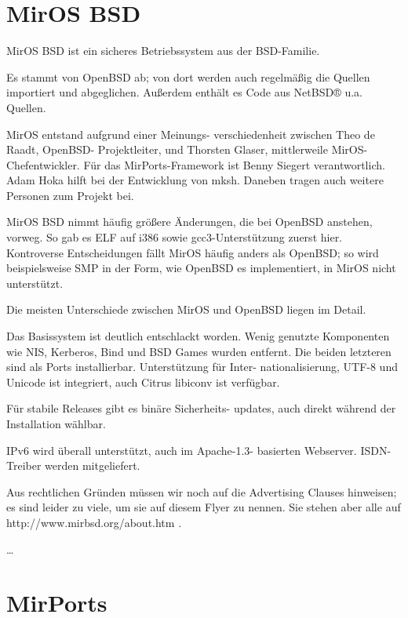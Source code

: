 \documentclass[
a4paper,%
notumble%
]{leaflet}
\begin{document}
\newpage

\section{MirOS BSD}

{\Large MirOS BSD ist ein sicheres Betriebssystem aus der BSD-Familie.\par}

Es stammt von OpenBSD ab; von dort werden auch regelmäßig die Quellen importiert und abgeglichen. Außerdem enthält es Code aus NetBSD® u.a. Quellen.

MirOS entstand aufgrund einer Meinungs- verschiedenheit zwischen Theo de Raadt, OpenBSD- Projektleiter, und Thorsten Glaser, mittlerweile MirOS- Chefentwickler. Für das MirPorts-Framework ist Benny Siegert verantwortlich. Adam Hoka hilft bei der Entwicklung von mksh. Daneben tragen auch weitere Personen zum Projekt bei.

MirOS BSD nimmt häufig größere Änderungen, die bei OpenBSD anstehen, vorweg. So gab es ELF auf i386 sowie gcc3-Unterstützung zuerst hier. Kontroverse Entscheidungen fällt MirOS häufig anders als OpenBSD; so wird beispielsweise SMP in der Form, wie OpenBSD es implementiert, in MirOS nicht unterstützt.

Die meisten Unterschiede zwischen MirOS und OpenBSD liegen im Detail.

Das Basissystem ist deutlich entschlackt worden. Wenig genutzte Komponenten wie NIS, Kerberos, Bind und BSD Games wurden entfernt. Die beiden letzteren sind als Ports installierbar. Unterstützung für Inter- nationalisierung, UTF-8 und Unicode ist integriert, auch Citrus libiconv ist verfügbar.

Für stabile Releases gibt es binäre Sicherheits- updates, auch direkt während der Installation wählbar.

IPv6 wird überall unterstützt, auch im Apache-1.3- basierten Webserver. ISDN-Treiber werden mitgeliefert.

Aus rechtlichen Gründen müssen wir noch auf die Advertising Clauses hinweisen; es sind leider zu viele, um sie auf diesem Flyer zu nennen. Sie stehen aber alle
auf http://www.mirbsd.org/about.htm .

\newpage

{\centering\dots}

\newpage

\section{MirPorts}
\end{document}
